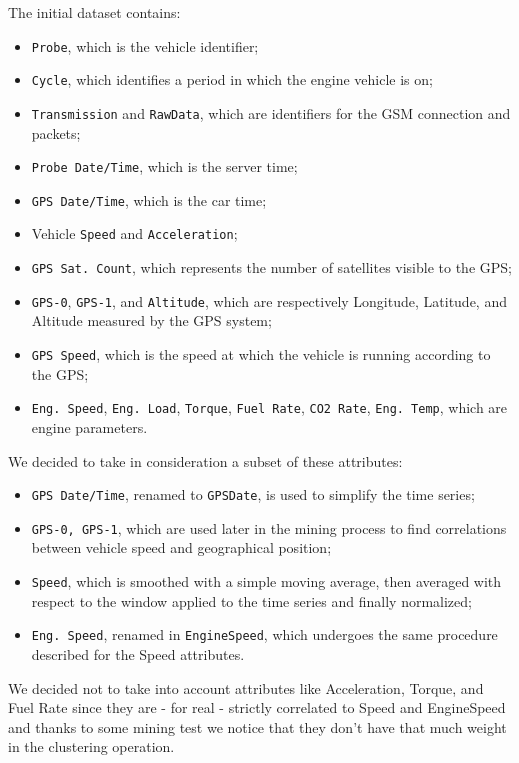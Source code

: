 The initial dataset contains:
\begin{itemize}
\item \texttt{Probe}, which is the vehicle identifier;
\item \texttt{Cycle}, which identifies a period in which the engine vehicle is on;
\item \texttt{Transmission} and \texttt{RawData}, which are identifiers for the GSM connection and packets;
\item \texttt{Probe Date/Time}, which is the server time;
\item \texttt{GPS Date/Time}, which is the car time;
\item Vehicle \texttt{Speed} and \texttt{Acceleration};
\item \texttt{GPS Sat. Count}, which represents the number of satellites visible to the GPS;
\item \texttt{GPS-0}, \texttt{GPS-1}, and \texttt{Altitude}, which are respectively Longitude, Latitude, and Altitude measured by the GPS system;
\item \texttt{GPS Speed}, which is the speed at which the vehicle is running according to the GPS;
\item \texttt{Eng. Speed}, \texttt{Eng. Load}, \texttt{Torque}, \texttt{Fuel Rate}, \texttt{CO2 Rate}, \texttt{Eng. Temp}, which are engine parameters.
\end{itemize}
We decided to take in consideration a subset of these attributes:
\begin{itemize}
\item \texttt{GPS Date/Time}, renamed to \texttt{GPSDate}, is used to simplify the time series;
\item \texttt{GPS-0, GPS-1}, which are used later in the mining process to find correlations between vehicle speed and geographical position;
\item \texttt{Speed}, which is smoothed with a simple moving average, then averaged with respect to the window applied to the time series and finally normalized;
\item \texttt{Eng. Speed}, renamed in \texttt{EngineSpeed}, which undergoes the same procedure described for the Speed attributes.
\end{itemize}
We decided not to take into account attributes like Acceleration, Torque, and Fuel Rate since they are - for real - strictly correlated to Speed and EngineSpeed and thanks to some mining test we notice that they don't have that much weight in the clustering operation.

